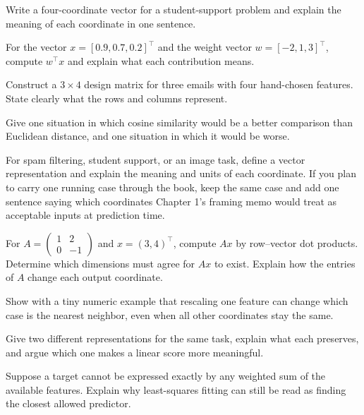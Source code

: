 \begin{exercises}
\item {}Write a four-coordinate vector for a student-support problem and explain the meaning of each coordinate in one sentence.
\item {}For the vector \(x = [0.9, 0.7, 0.2]^\top\) and the weight vector \(w = [-2, 1, 3]^\top\), compute \(w^\top x\) and explain what each contribution means.
\item {}Construct a \(3 \times 4\) design matrix for three emails with four hand-chosen features. State clearly what the rows and columns represent.
\item {}Give one situation in which cosine similarity would be a better comparison than Euclidean distance, and one situation in which it would be worse.
\item {}For spam filtering, student support, or an image task, define a vector representation and explain the meaning and units of each coordinate. If you plan to carry one running case through the book, keep the same case and add one sentence saying which coordinates Chapter 1's framing memo would treat as acceptable inputs at prediction time.
\item {}For $A=\begin{pmatrix}1&2\\0&-1\end{pmatrix}$ and $x=(3,4)^\top$, compute $Ax$ by row--vector dot products. Determine which dimensions must agree for $Ax$ to exist. Explain how the entries of $A$ change each output coordinate.

\end{exercises}

\begin{challengeexercises}
\item {}Show with a tiny numeric example that rescaling one feature can change which case is the nearest neighbor, even when all other coordinates stay the same.
\item {}Give two different representations for the same task, explain what each preserves, and argue which one makes a linear score more meaningful.
\item {}Suppose a target cannot be expressed exactly by any weighted sum of the available features. Explain why least-squares fitting can still be read as finding the closest allowed predictor.
\end{challengeexercises}
